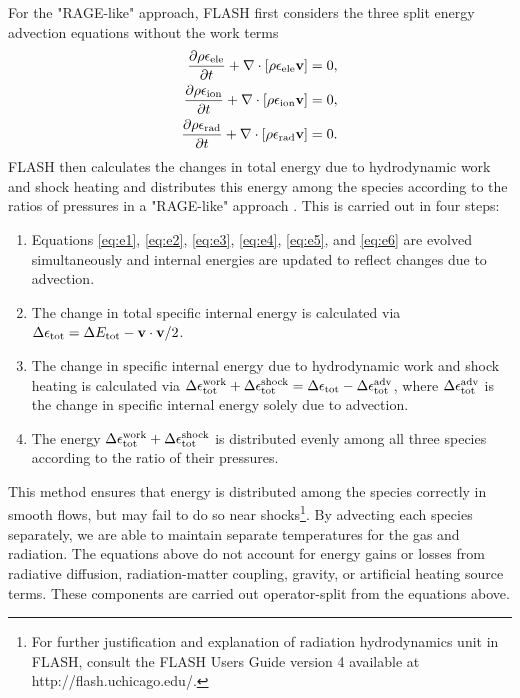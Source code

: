 \documentclass[preprint,11pt]{aastex}
\newcommand{\bea}{\begin{eqnarray}}
\newcommand{\eea}{\end{eqnarray}}
\begin{document}
{For the "RAGE-like" approach, FLASH first considers the three split energy advection equations without the work terms
\bea 
\label{eq:e4}
\frac{\partial \rho \epsilon_{\rm ele}}{\partial t} + \nabla \cdot [\rho \epsilon_{\rm ele} \mathbf{v}] = 0, \\
\label{eq:e5}
\frac{\partial \rho \epsilon_{\rm ion}}{\partial t} + \nabla \cdot [\rho \epsilon_{\rm ion} \mathbf{v}] = 0, \\
\label{eq:e6}
\frac{\partial \rho \epsilon_{\rm rad}}{\partial t} + \nabla \cdot [\rho \epsilon_{\rm rad} \mathbf{v}] = 0.
\eea
FLASH then calculates the changes in total energy due to hydrodynamic work and shock heating and distributes this energy among the species according to the ratios of pressures in a "RAGE-like" approach \citep{Gittings:08}.  This is carried out in four steps:
\begin{enumerate}
  \item Equations \ref{eq:e1}, \ref{eq:e2}, \ref{eq:e3}, \ref{eq:e4}, \ref{eq:e5}, and \ref{eq:e6} are evolved simultaneously and internal energies are updated to reflect changes due to advection.
  \item The change in total specific internal energy is calculated via $\Delta \epsilon_{\rm tot} = \Delta E_{\rm tot} - \mathbf{v} \cdot \mathbf{v} / 2$.
  \item The change in specific internal energy due to hydrodynamic work and shock heating is calculated via $\Delta \epsilon^{\rm work}_{\rm tot} + \Delta \epsilon^{\rm shock}_{\rm tot} = \Delta \epsilon_{\rm tot} - \Delta \epsilon_{\rm tot}^{\rm adv}$, where $\Delta \epsilon_{\rm tot}^{\rm adv}$ is the change in specific internal energy solely due to advection.
  \item The energy $\Delta \epsilon^{\rm work}_{\rm tot} + \Delta \epsilon^{\rm shock}_{\rm tot}$ is distributed evenly among all three species according to the ratio of their pressures.
\end{enumerate}
This method ensures that energy is distributed among the species correctly in smooth flows, but may fail to do so near shocks\footnote{For further justification and explanation of radiation hydrodynamics unit in FLASH, consult the FLASH Users Guide version 4 available at http://flash.uchicago.edu/.}.  By advecting each species separately, we are able to maintain separate temperatures for the gas and radiation.  The equations above do not account for energy gains or losses from radiative diffusion, radiation-matter coupling, gravity, or artificial heating source terms.  These components are carried out operator-split from the equations above.
}
\end{document}
